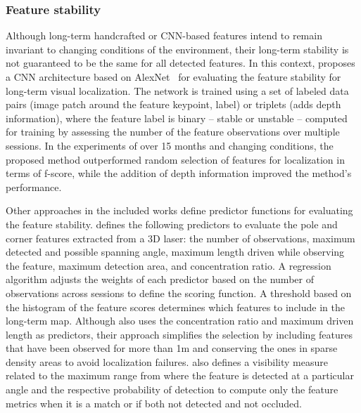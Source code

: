 \subsubsection{Feature stability}

Although long-term handcrafted or CNN-based features intend to remain invariant to changing conditions of the environment, their long-term stability is not guaranteed to be the same for all detected features. In this context, \cite{dymczyk-et-al:2016:66} proposes a CNN architecture based on AlexNet~\parencite{original:alexnet} for evaluating the feature stability for long-term visual localization. The network is trained using a set of labeled data pairs (image patch around the feature keypoint, label) or triplets (adds depth information), where the feature label is binary -- stable or unstable -- computed for training by assessing the number of the feature observations over multiple sessions. In the experiments of over 15 months and changing conditions, the proposed method outperformed random selection of features for localization in terms of f-score, while the addition of depth information improved the method's performance.

Other approaches in the included works define predictor functions for evaluating the feature stability.
\cite{berrio-et-al:2019:8814289} defines the following predictors to evaluate the pole and corner features extracted from a 3D laser: the number of observations, maximum detected and possible spanning angle, maximum length driven while observing the feature, maximum detection area, and concentration ratio. A regression algorithm adjusts the weights of each predictor based on the number of observations across sessions to define the scoring function. A threshold based on the histogram of the feature scores determines which features to include in the long-term map.
Although \cite{berrio-et-al:2021:3094485} also uses the concentration ratio and maximum driven length as predictors, their approach simplifies the selection by including features that have been observed for more than 1m and conserving the ones in sparse density areas to avoid localization failures. \cite{berrio-et-al:2021:3094485} also defines a visibility measure related to the maximum range from where the feature is detected at a particular angle and the respective probability of detection to compute only the feature metrics when it is a match or if both not detected and not occluded.

